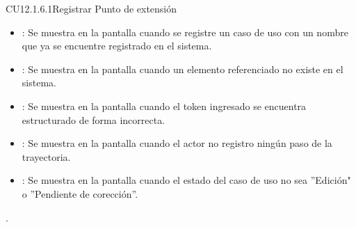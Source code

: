 \begin{UseCase}{CU12.1.6.1}{Registrar Punto de extensión}
{\begin{itemize}
		\item {}: Se muestra en la pantalla  cuando se registre un caso de uso con un nombre que ya se encuentre registrado en el sistema.
		\item {}: Se muestra en la pantalla  cuando un elemento referenciado no existe en el sistema.
		\item {}: Se muestra en la pantalla  cuando el token ingresado se encuentra estructurado de forma incorrecta.
		\item {}: Se muestra en la pantalla  cuando el actor no registro ningún paso de la trayectoria.
		\item {}: Se muestra en la pantalla  cuando el estado del caso de uso no sea ''Edición" o ''Pendiente
		de corección''.
		\end{itemize}.
		}
	\end{UseCase}
